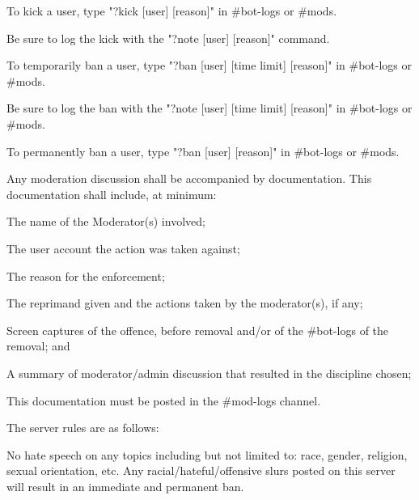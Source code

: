 \begin{longenum}[ label*=\thesubsection.\arabic*., align=left]
\begin{longenum}[label*=\arabic*., align=left]
\begin{longenum}[label*=\arabic*., align=left]
\begin{longenum}[label*=\arabic*., align=left]
				\end{longenum}	
			\item To kick a user, type "?kick [user] [reason]" in \#bot-logs or \#mods.
				\begin{longenum}[label*=\arabic*., align=left]
				\item Be sure to log the kick with the "?note [user] [reason]" command.
				\end{longenum}	
			\item To temporarily ban a user, type "?ban [user] [time limit] [reason]" in \#bot-logs or \#mods.
				\begin{longenum}[label*=\arabic*., align=left]
				\item Be sure to log the ban with the "?note [user] [time limit] [reason]" in \#bot-logs or \#mods.
				\end{longenum}	
			\item To permanently ban a user, type "?ban [user] [reason]" in \#bot-logs or \#mods.
			\end{longenum}	
		\item Any moderation discussion shall be accompanied by documentation. This documentation shall include, at minimum:
			\begin{longenum}[label*=\arabic*., align=left]
			\item The name of the Moderator(s) involved;
			\item The user account the action was taken against;
			\item The reason for the enforcement;
			\item The reprimand given and the actions taken by the moderator(s), if any;
			\item Screen captures of the offence, before removal and/or of the \#bot-logs of the removal; and
			\item A summary of moderator/admin discussion that resulted in the discipline chosen;
			\item This documentation must be posted in the \#mod-logs channel.
			\end{longenum}	
		\end{longenum}	
	\item The server rules are as follows:
		\begin{longenum}[label*=\arabic*., align=left]	
			\item No hate speech on any topics including but not limited to: race, gender, religion, sexual orientation, etc. Any racial/hateful/offensive slurs posted on this server will result in an immediate and permanent ban.

\end{longenum}
\end{longenum}
